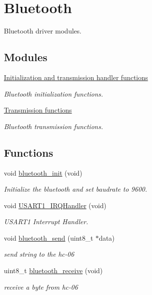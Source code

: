\hypertarget{group___bluetooth}{}\section{Bluetooth}
\label{group___bluetooth}


Bluetooth driver modules.  


\subsection*{Modules}
\begin{DoxyCompactItemize}
\item 
\hyperlink{group___initialization}{Initialization and transmission handler functions}
\begin{DoxyCompactList}\small\item\em Bluetooth initialization functions. \end{DoxyCompactList}\item 
\hyperlink{group___transmission}{Transmission functions}
\begin{DoxyCompactList}\small\item\em Bluetooth transmission functions. \end{DoxyCompactList}\end{DoxyCompactItemize}
\subsection*{Functions}
\begin{DoxyCompactItemize}
\item 
void \hyperlink{group___bluetooth_gaaa60810e0857e9e1e5b2cba80b8db3ff}{bluetooth\+\_\+init} (void)
\begin{DoxyCompactList}\small\item\em Initialize the bluetooth and set baudrate to 9600. \end{DoxyCompactList}\item 
void \hyperlink{group___bluetooth_ga7139cd4baabbbcbab0c1fe6d7d4ae1cc}{U\+S\+A\+R\+T1\+\_\+\+I\+R\+Q\+Handler} (void)
\begin{DoxyCompactList}\small\item\em U\+S\+A\+R\+T1 Interrupt Handler. \end{DoxyCompactList}\item 
void \hyperlink{group___bluetooth_ga31d829d5658369ee2c90b9c3cdbedfe1}{bluetooth\+\_\+send} (uint8\+\_\+t $\ast$data)
\begin{DoxyCompactList}\small\item\em send string to the hc-\/06 \end{DoxyCompactList}\item 
uint8\+\_\+t \hyperlink{group___bluetooth_gab7ad1e1b94cf1cedc8a8e5151b0e25cb}{bluetooth\+\_\+receive} (void)
\begin{DoxyCompactList}\small\item\em receive a byte from hc-\/06 \end{DoxyCompactList}\end{DoxyCompactItemize}


